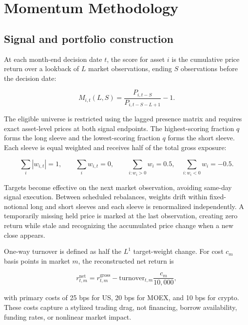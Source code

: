 \documentclass[11pt,a4paper]{article}
\begin{document}
\section{Momentum Methodology}

\subsection{Signal and portfolio construction}

At each month-end decision date $t$, the score for asset $i$ is the cumulative price return over a lookback of $L$ market observations, ending $S$ observations before the decision date:

\begin{equation}
  M_{i,t}(L,S) = \frac{P_{i,t-S}}{P_{i,t-S-L+1}} - 1.
\end{equation}

The eligible universe is restricted using the lagged presence matrix and requires exact asset-level prices at both signal endpoints. The highest-scoring fraction $q$ forms the long sleeve and the lowest-scoring fraction $q$ forms the short sleeve. Each sleeve is equal weighted and receives half of the total gross exposure:

\begin{equation}
  \sum_i |w_{i,t}| = 1, \qquad \sum_i w_{i,t}=0, \qquad
  \sum_{i:w_i>0}w_i=0.5, \quad \sum_{i:w_i<0}w_i=-0.5.
\end{equation}

Targets become effective on the next market observation, avoiding same-day signal execution. Between scheduled rebalances, weights drift within fixed-notional long and short sleeves and each sleeve is renormalized independently. A temporarily missing held price is marked at the last observation, creating zero return while stale and recognizing the accumulated price change when a new close appears.

One-way turnover is defined as half the $L^1$ target-weight change. For cost $c_m$ basis points in market $m$, the reconstructed net return is

\begin{equation}
  r^{\mathrm{net}}_{t,m}=r^{\mathrm{gross}}_{t,m}-\mathrm{turnover}_{t,m}\frac{c_m}{10{,}000},
\end{equation}

with primary costs of 25 bps for US, 20 bps for MOEX, and 10 bps for crypto. These costs capture a stylized trading drag, not financing, borrow availability, funding rates, or nonlinear market impact.
\end{document}
